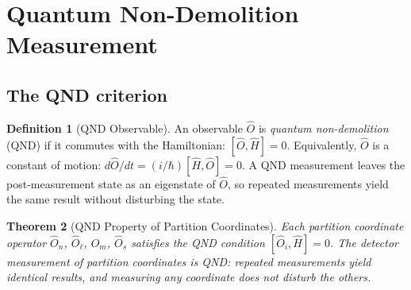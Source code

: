 \documentclass[twocolumn,10pt,a4paper]{article}
\theoremstyle{thmstyle}
\newtheorem{theorem}{Theorem}[section]
\theoremstyle{definition}
\newtheorem{definition}[theorem]{Definition}
\theoremstyle{remark}
\begin{document}
\section{Quantum Non-Demolition Measurement}
\label{sec:qnd}

\subsection{The QND criterion}

\begin{definition}[QND Observable]
An observable $\hat{O}$ is \emph{quantum non-demolition} (QND) if it
commutes with the Hamiltonian: $[\hat{O}, \hat{H}] = 0$.
Equivalently, $\hat{O}$ is a constant of motion: $d\hat{O}/dt = (i/\hbar)[\hat{H},\hat{O}] = 0$.
A QND measurement leaves the post-measurement state as an eigenstate of
$\hat{O}$, so repeated measurements yield the same result without disturbing
the state.
\end{definition}

\begin{theorem}[QND Property of Partition Coordinates]
\label{thm:qnd}
Each partition coordinate operator $\hat{O}_n$, $\hat{O}_\ell$, $\hat{O}_m$,
$\hat{O}_s$ satisfies the QND condition $[\hat{O}_i, \hat{H}] = 0$.
The detector measurement of partition coordinates is QND: repeated
measurements yield identical results, and measuring any coordinate does not
disturb the others.
\end{theorem}
\end{document}
